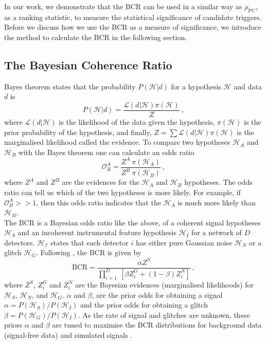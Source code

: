 \documentclass[%
preprint,
 amsmath,amssymb,
 aps,
]{revtex4}
\newcommand{\bcr}{{\sc BCR}\xspace}
\begin{document}
In our work, we demonstrate that the \bcr can be used in a similar way as $\rho_\text{PC}$, as a ranking statistic, to measure the statistical significance of candidate triggers. Before we discuss how we use the \bcr as a measure of significance, we introduce the method to calculate the \bcr in the following section.\\


\subsection{The Bayesian Coherence Ratio}

Bayes theorem states that the probability $P(\mathcal{H}|d)$ for a hypothesis $\mathcal{H}$ and data $d$ is
\begin{equation}
    P(\mathcal{H}|d) = \frac{\mathcal{L}(d|\mathcal{H})\pi(\mathcal{H})}{Z}\ , 
\end{equation}
where $\mathcal{L}(d|\mathcal{H})$ is the likelihood of the data given
the hypothesis,  $\pi(\mathcal{H})$ is the prior probability of the hypothesis, and finally, $Z = \sum \mathcal{L}(d|\mathcal{H})  \pi(\mathcal{H})$ is the marginalised likelihood called the evidence. To compare two hypotheses $\mathcal{H}_A$ and $\mathcal{H}_B$ with the Bayes theorem one can calculate an odds ratio
\begin{equation}
    \mathcal{O}^A_B = \frac{Z^A\ \pi(\mathcal{H}_A)}{Z^B\ \pi(\mathcal{H}_B)}\ ,
\end{equation}
where $Z^A$ and $Z^B$ are the evidences for the $\mathcal{H}_A$ and $\mathcal{H}_B$ hypotheses. The odds ratio can tell us which of the two hypotheses is more likely. For example, if $\mathcal{O}^A_B >> 1$, then this odds ratio indicates that the $\mathcal{H}_A$ is much more likely than $\mathcal{H}_B$. \\

The \bcr is a Bayesian odds ratio like the above, of a coherent signal hypotheses $\mathcal{H}_S$ and an incoherent instrumental feature hypothesis $\mathcal{H}_I$ for a network of $D$ detectors. $\mathcal{H_I}$ states that each detector $i$ has either pure Gaussian noise $\mathcal{H}_N$ or a glitch $\mathcal{H}_G$. Following \citet{BCR1}, the \bcr is given by
\begin{equation}
\label{eq:bcr}
\text{BCR} = \frac{\alpha Z^S}{\prod\limits^D_{i=1} \ [\beta Z^G_i + (1-\beta)Z^N_i]}\ ,
\end{equation}
where $Z^S$, $Z^G_i$ and $Z^N_i$ are the Bayesian evidences (marginalised likelihoods) for $\mathcal{H}_S$, $\mathcal{H}_N$, and $\mathcal{H}_G$. $\alpha$ and $\beta$, are the prior odds for obtaining a signal $\alpha=P(\mathcal{H}_S)/P(\mathcal{H}_I)$ and the prior odds for obtaining a glitch $\beta=P(\mathcal{H}_G)/P(\mathcal{H}_I)$. As the rate of signal and glitches are unknown, these priors $\alpha$ and $\beta$ are tuned to maximise the \bcr distributions for background data (signal-free data) and simulated signals \cite{BCR1}.  \\
\end{document}
